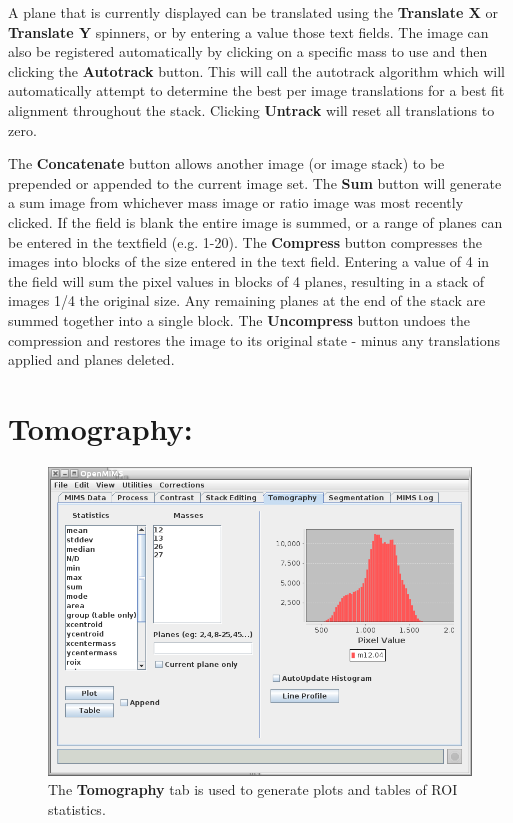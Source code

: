 \documentclass{article}
\begin{document}
	A plane that is currently displayed can be translated using 
	the \textbf{Translate X} or \textbf{Translate Y} spinners, or by
	entering a value those text fields. The image can also be 
	registered automatically by clicking on a specific mass
	to use and then clicking the \textbf{Autotrack} button. 
	This will call the autotrack algorithm 
	which will automatically attempt to determine the best 
	per image translations for a best fit alignment
	throughout the stack. Clicking \textbf{Untrack} will 
	reset all translations to zero.

	The \textbf{Concatenate} button allows another image (or image stack) to be
	prepended or appended to the current image set. The \textbf{Sum} button will 
	generate a sum image from whichever mass image or ratio
	image was most recently clicked. If the field is blank the entire image is summed, 
	or a range of planes can be entered in the textfield (e.g. 1-20). The \textbf{Compress} button 
	compresses the images into blocks of the size entered in the text field. Entering 
	a value of 4 in the field will sum the pixel values in blocks of 4 planes,
	resulting in a stack of images 1/4 the original size. Any
	remaining planes at the end of the stack are summed together into a single block.
	The \textbf{Uncompress} button undoes the compression and restores the image to its original
	state - minus any translations applied and planes deleted.



\newpage
\section*{Tomography:}
	
	\begin{figure}[h]
	\centering
	\includegraphics[scale=0.68]{snapshot_MimsTomography.png}
	\caption{The \textbf{Tomography} tab is used to generate plots and tables of ROI statistics.}
	\end{figure}
	
\end{document}
